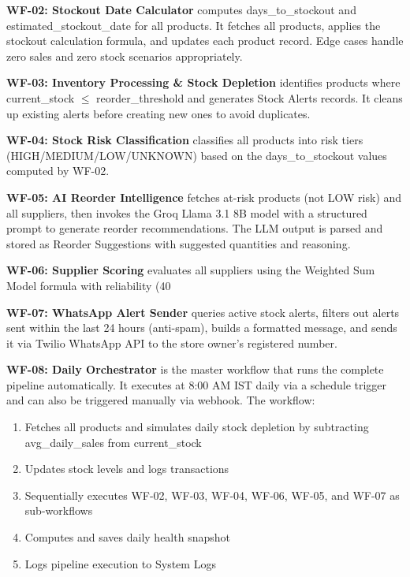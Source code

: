 \documentclass[journal]{IEEEtran}
\begin{document}
\textbf{WF-02: Stockout Date Calculator} computes days\_to\_stockout and estimated\_stockout\_date for all products. It fetches all products, applies the stockout calculation formula, and updates each product record. Edge cases handle zero sales and zero stock scenarios appropriately.

\textbf{WF-03: Inventory Processing \& Stock Depletion} identifies products where current\_stock $\leq$ reorder\_threshold and generates Stock Alerts records. It cleans up existing alerts before creating new ones to avoid duplicates.

\textbf{WF-04: Stock Risk Classification} classifies all products into risk tiers (HIGH/MEDIUM/LOW/UNKNOWN) based on the days\_to\_stockout values computed by WF-02.

\textbf{WF-05: AI Reorder Intelligence} fetches at-risk products (not LOW risk) and all suppliers, then invokes the Groq Llama 3.1 8B model with a structured prompt to generate reorder recommendations. The LLM output is parsed and stored as Reorder Suggestions with suggested quantities and reasoning.

\textbf{WF-06: Supplier Scoring} evaluates all suppliers using the Weighted Sum Model formula with reliability (40%

\textbf{WF-07: WhatsApp Alert Sender} queries active stock alerts, filters out alerts sent within the last 24 hours (anti-spam), builds a formatted message, and sends it via Twilio WhatsApp API to the store owner's registered number.

\textbf{WF-08: Daily Orchestrator} is the master workflow that runs the complete pipeline automatically. It executes at 8:00 AM IST daily via a schedule trigger and can also be triggered manually via webhook. The workflow:
\begin{enumerate}
\item Fetches all products and simulates daily stock depletion by subtracting avg\_daily\_sales from current\_stock
\item Updates stock levels and logs transactions
\item Sequentially executes WF-02, WF-03, WF-04, WF-06, WF-05, and WF-07 as sub-workflows
\item Computes and saves daily health snapshot
\item Logs pipeline execution to System Logs
\end{enumerate}
\end{document}
